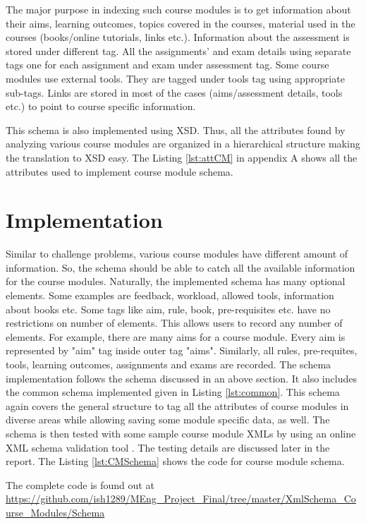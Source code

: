 \documentclass[11pt,letterpaper]{report}
\begin{document}
The major purpose in indexing such course modules is to get information about their aims, learning outcomes, topics covered in the courses, material used in the courses (books/online tutorials, links etc.). Information about the assessment is stored under different tag. All the assignments' and exam details using separate tags one for each assignment and exam under assessment tag. Some course modules use external tools. They are tagged under tools tag using appropriate sub-tags. Links are stored in most of the cases (aims/assessment details, tools etc.) to point to course specific information.     
 
This schema is also implemented using XSD. Thus, all the attributes found by analyzing various course modules are organized in a hierarchical structure making the translation to XSD easy. The Listing \ref{lst:attCM} in appendix A shows all the attributes used to implement course module schema.


\section*{Implementation}
Similar to challenge problems, various course modules have different amount of information. So, the schema should be able to catch all the available information for the course modules. Naturally, the implemented schema has many optional elements. Some examples are feedback, workload, allowed tools, information about books etc. Some tags like aim, rule, book, pre-requisites etc. have no restrictions on number of elements. This allows users to record any number of elements. For example, there are many aims for a course module. Every aim is represented by "aim" tag inside outer tag "aims". Similarly, all rules, pre-requites, tools, learning outcomes, assignments and exams are recorded.    
The schema implementation follows the schema discussed in an above section. It also includes the common schema implemented given in Listing \ref{lst:common}. This schema again covers the general structure to tag all the attributes of course modules in diverse areas while allowing saving some module specific data, as well. The schema is then tested with some sample course module XMLs by using an online XML schema validation tool \cite{olXSD}. The testing details are discussed later in the report.  The Listing \ref{lst:CMSchema} shows the code for course module schema.
 
The complete code is found out at \url{https://github.com/ish1289/MEng_Project_Final/tree/master/XmlSchema_Course_Modules/Schema}
\end{document}
